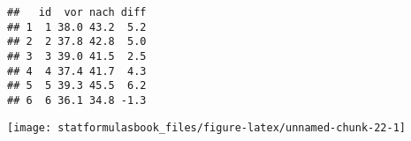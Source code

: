 \documentclass[
]{book}
\newenvironment{Shaded}{\begin{snugshade}}{\end{snugshade}}
\newcommand{\CommentTok}[1]{\textcolor[rgb]{0.56,0.35,0.01}{\textit{#1}}}
\newcommand{\DocumentationTok}[1]{\textcolor[rgb]{0.56,0.35,0.01}{\textbf{\textit{#1}}}}
\newcommand{\FunctionTok}[1]{\textcolor[rgb]{0.00,0.00,0.00}{#1}}
\newcommand{\NormalTok}[1]{#1}
\newcommand{\SpecialCharTok}[1]{\textcolor[rgb]{0.00,0.00,0.00}{#1}}
\begin{document}
\begin{verbatim}
##   id  vor nach diff
## 1  1 38.0 43.2  5.2
## 2  2 37.8 42.8  5.0
## 3  3 39.0 41.5  2.5
## 4  4 37.4 41.7  4.3
## 5  5 39.3 45.5  6.2
## 6  6 36.1 34.8 -1.3
\end{verbatim}

\begin{Shaded}
\end{Shaded}

\begin{center}\texttt{[image: statformulasbook\_files/figure-latex/unnamed-chunk-22-1]} \end{center}
\end{document}
